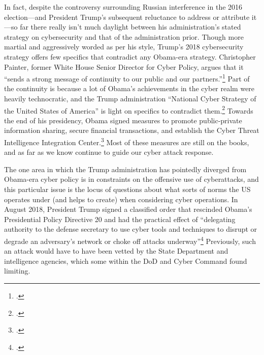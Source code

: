 \documentclass{memoir}
\begin{document}
\begin{refsegment}
In fact, despite the controversy surrounding Russian interference in the 2016 election---and President Trump's subsequent reluctance to address or attribute it---so far there really isn't much daylight between his administration's stated strategy on cybersecurity and that of the administration prior. Though more martial and aggressively worded as per his style, Trump's 2018 cybersecurity strategy offers few specifics that contradict any Obama-era strategy. Christopher Painter, former White House Senior Director for Cyber Policy, argues that it ``sends a strong message of continuity to our public and our partners.''\footcite[Painter also served at the State Department for six years as the Coordinator for Cyber Issues, which at the time was an Assistant Secretary level position. Since then, its status within the department has fluctuated wildly. Rex Tillerson, Trump's first Secretary of State, announced that he would abolish the office and merge it into State's Bureau of Economic Affairs. Then, just a few months later, he proposed creating an entirely new department bureau with a Senate-confirmed Assistant Secretary, possibly in response to criticism of his first decision. Though current Secretary Mike Pompeo appears to have more interest in cyber policy, the State Department still has not reestablished a high level cyber position.]{painter_white_2018} Part of the continuity is because a lot of Obama's achievements in the cyber realm were heavily technocratic, and the Trump administration ``National Cyber Strategy of the United States of America'' is light on specifics to contradict them.\footcite{guest_blogger_white_2018} Towards the end of his presidency, Obama signed measures to promote public-private information sharing, secure financial transactions, and establish the Cyber Threat Intelligence Integration Center.\footcite[Among other actions taken during the Obama presidency, these were sufficenct for PolitiFact to update its 2013 rating of his cyber-enforcement actions to ``Promise Kept.'']{carroll_obama_2016} Most of these measures are still on the books, and as far as we know continue to guide our cyber attack response.

The one area in which the Trump administration has pointedly diverged from Obama-era cyber policy is in constraints on the offensive use of cyberattacks, and this particular issue is the locus of questions about what sorts of norms the US operates under (and helps to create) when considering cyber operations. In August 2018, President Trump signed a classified order that rescinded Obama's Presidential Policy Directive 20 and had the practical effect of ``delegating authority to the defense secretary to use cyber tools and techniques to disrupt or degrade an adversary's network or choke off attacks underway''\footcite{nakashima_trump_2018} Previously, such an attack would have to have been vetted by the State Department and intelligence agencies, which some within the DoD and Cyber Command found limiting.


\end{refsegment}
\end{document}
